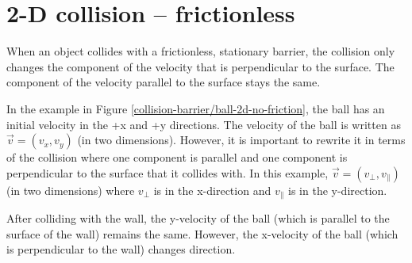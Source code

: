 

\section*{2-D collision -- frictionless}

When an object collides with a frictionless, stationary barrier, the collision only changes the component of the velocity that is perpendicular to the surface. The component of the velocity parallel to the surface stays the same. 

In the example in Figure \ref{collision-barrier/ball-2d-no-friction}, the ball has an initial velocity in the +x and +y directions. The velocity of the ball is written as $\vec{v}=(v_x,v_y)$ (in two dimensions). However, it is important to rewrite it in terms of the collision where one component is parallel and one component is perpendicular to the surface that it collides with. In this example, $\vec{v}=(v_\perp,v_\parallel)$ (in two dimensions) where $v_\perp$ is in the x-direction and $v_\parallel$ is in the y-direction.


After colliding with the wall, the y-velocity of the ball (which is parallel to the surface of the wall) remains the same. However, the x-velocity of the ball (which is perpendicular to the wall) changes direction.  


